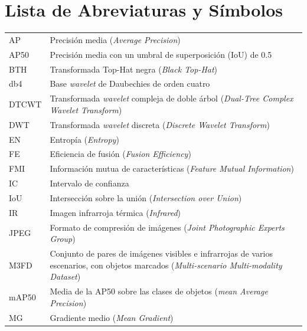 \chapter*{Lista de Abreviaturas y Símbolos}
{}

{\setlength{\LTleft}{0pt}\setlength{\LTpre}{0pt}
\begin{longtable}{@{}>{\raggedleft\arraybackslash}p{}p{}@{}}
AP     & Precisión media (\textit{Average Precision}) \\
AP50   & Precisión media con un umbral de superposición (IoU) de 0.5 \\
BTH    & Transformada Top-Hat negra (\textit{Black Top-Hat}) \\
db4    & Base \textit{wavelet} de Daubechies de orden cuatro \\
DTCWT  & Transformada \textit{wavelet} compleja de doble árbol (\textit{Dual-Tree Complex Wavelet Transform}) \\
DWT    & Transformada \textit{wavelet} discreta (\textit{Discrete Wavelet Transform}) \\
EN     & Entropía (\textit{Entropy}) \\
FE     & Eficiencia de fusión (\textit{Fusion Efficiency}) \\
FMI    & Información mutua de características (\textit{Feature Mutual Information}) \\
IC     & Intervalo de confianza \\
IoU    & Intersección sobre la unión (\textit{Intersection over Union}) \\
IR     & Imagen infrarroja térmica (\textit{Infrared}) \\
JPEG   & Formato de compresión de imágenes (\textit{Joint Photographic Experts Group}) \\
M3FD   & Conjunto de pares de imágenes visibles e infrarrojas de varios escenarios, con objetos marcados (\textit{Multi-scenario Multi-modality Dataset}) \\
mAP50  & Media de la AP50 sobre las clases de objetos (\textit{mean Average Precision}) \\
MG     & Gradiente medio (\textit{Mean Gradient}) \\

\end{longtable}}
